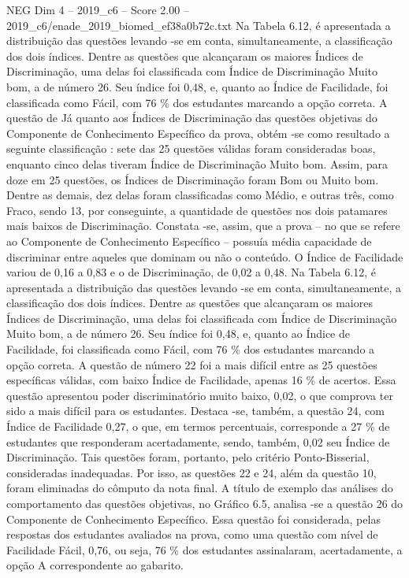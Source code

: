 \begin{textsample}{NEG Dim 4 – 2019\_c6 – Score 2.00 – 2019\_c6/enade\_2019\_biomed\_ef38a0b72c.txt}
Na Tabela 6.12, é apresentada a distribuição das questões levando -se em conta, simultaneamente, a classificação dos dois índices.
Dentre as questões que alcançaram os maiores Índices de Discriminação, uma delas foi classificada com Índice de Discriminação Muito bom, a de número 26.
Seu índice foi 0,48, e, quanto ao Índice de Facilidade, foi classificada como Fácil, com 76 \% dos estudantes marcando a opção correta.
A questão de Já quanto aos Índices de Discriminação das questões objetivas do Componente de Conhecimento Específico da prova, obtém -se como resultado a seguinte classificação : sete das 25 questões válidas foram consideradas boas, enquanto cinco delas tiveram Índice de Discriminação Muito bom.
Assim, para doze em 25 questões, os Índices de Discriminação foram Bom ou Muito bom.
Dentre as demais, dez delas foram classificadas como Médio, e outras três, como Fraco, sendo 13, por conseguinte, a quantidade de questões nos dois patamares mais baixos de Discriminação.
Constata -se, assim, que a prova – no que se refere ao Componente de Conhecimento Específico – possuía média capacidade de discriminar entre aqueles que dominam ou não o conteúdo.
O Índice de Facilidade variou de 0,16 a 0,83 e o de Discriminação, de 0,02 a 0,48.
Na Tabela 6.12, é apresentada a distribuição das questões levando -se em conta, simultaneamente, a classificação dos dois índices.
Dentre as questões que alcançaram os maiores Índices de Discriminação, uma delas foi classificada com Índice de Discriminação Muito bom, a de número 26.
Seu índice foi 0,48, e, quanto ao Índice de Facilidade, foi classificada como Fácil, com 76 \% dos estudantes marcando a opção correta.
A questão de número 22 foi a mais difícil entre as 25 questões específicas válidas, com baixo Índice de Facilidade, apenas 16 \% de acertos.
Essa questão apresentou poder discriminatório muito baixo, 0,02, o que comprova ter sido a mais difícil para os estudantes.
Destaca -se, também, a questão 24, com Índice de Facilidade 0,27, o que, em termos percentuais, corresponde a 27 \% de estudantes que responderam acertadamente, sendo, também, 0,02 seu Índice de Discriminação.
Tais questões foram, portanto, pelo critério Ponto-Bisserial, consideradas inadequadas.
Por isso, as questões 22 e 24, além da questão 10, foram eliminadas do cômputo da nota final.
A título de exemplo das análises do comportamento das questões objetivas, no Gráfico 6.5, analisa -se a questão 26 do Componente de Conhecimento Específico.
Essa questão foi considerada, pelas respostas dos estudantes avaliados na prova, como uma questão com nível de Facilidade Fácil, 0,76, ou seja, 76 \% dos estudantes assinalaram, acertadamente, a opção A correspondente ao gabarito.

\end{textsample}
